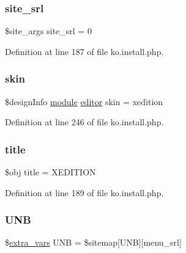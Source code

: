 \subsubsection{\texorpdfstring{site\+\_\+srl}{site\_srl}}
{\footnotesize\ttfamily \$site\+\_\+args site\+\_\+srl = 0}



Definition at line 187 of file ko.\+install.\+php.

\mbox{\label{ko_8install_8php_ab0f2b49fdb57754496b34f6b880cdeaf}} 
\subsubsection{\texorpdfstring{skin}{skin}}
{\footnotesize\ttfamily \$design\+Info \hyperlink{classmodule}{module} \hyperlink{classeditor}{editor} skin = \textquotesingle{}xedition\textquotesingle{}}



Definition at line 246 of file ko.\+install.\+php.

\mbox{\label{ko_8install_8php_a5b072c5fd1d2228c6ba5cee13cd142e3}} 
\subsubsection{\texorpdfstring{title}{title}}
{\footnotesize\ttfamily \$obj title = \textquotesingle{}X\+E\+D\+I\+T\+I\+ON\textquotesingle{}}



Definition at line 189 of file ko.\+install.\+php.

\mbox{\label{ko_8install_8php_abc0cb1f57d83d4a106f4495c30e0df52}} 
\subsubsection{\texorpdfstring{U\+NB}{UNB}}
{\footnotesize\ttfamily \$\hyperlink{ko_8install_8php_ae1dcb37fc34a8f312d2e6abd6f806743}{extra\+\_\+vars} U\+NB = \$sitemap\mbox{[}\textquotesingle{}U\+NB\textquotesingle{}\mbox{]}\mbox{[}\textquotesingle{}menu\+\_\+srl\textquotesingle{}\mbox{]}}



